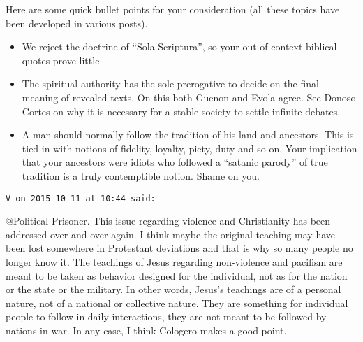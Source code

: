 \begin{footnotesize}
\begin{sffamily}
\begin{quotex}
\end{quotex}
Here are some quick bullet points for your consideration (all these topics have been developed in various posts).

\begin{itemize}
\item We reject the doctrine of “Sola Scriptura”, so your out of context biblical quotes prove little 
\item The spiritual authority has the sole prerogative to decide on the final meaning of revealed texts. On this both
Guenon and Evola agree. See Donoso Cortes on why it is necessary for a stable society to settle infinite debates. 
\item A man should normally follow the tradition of his land and ancestors. This is tied in with notions of fidelity,
loyalty, piety, duty and so on. Your implication that your ancestors were idiots who followed a “satanic parody” of
true tradition is a truly contemptible notion. Shame on you. 
\end{itemize}

\hfill

\texttt{V on 2015-10-11 at 10:44 said: }

@Political Prisoner.\newline
This issue regarding violence and Christianity has been addressed over and over again. I think maybe the original
teaching may have been lost somewhere in Protestant deviations and that is why so many people no longer know it. The
teachings of Jesus regarding non-violence and pacifism are meant to be taken as behavior designed for the individual,
not as for the nation or the state or the military. In other words, Jesus's teachings are of a personal
nature, not of a national or collective nature. They are something for individual people to follow in daily
interactions, they are not meant to be followed by nations in war. In any case, I think Cologero makes a good point.


\hfill
\end{sffamily}\end{footnotesize}
